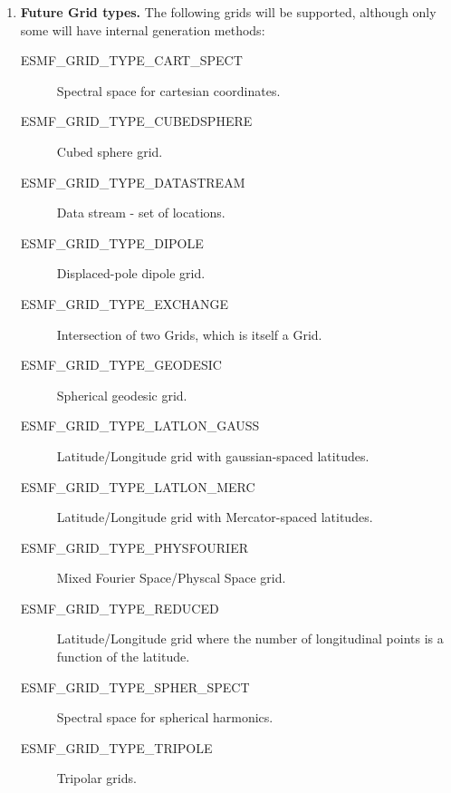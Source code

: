 \begin{enumerate}
\item {\bf Future Grid types.}  The following grids will
be supported, although only some will have internal generation 
methods:
 \begin{description}
    \item [ESMF\_GRID\_TYPE\_CART\_SPECT]
          Spectral space for cartesian coordinates.
    \item [ESMF\_GRID\_TYPE\_CUBEDSPHERE]
          Cubed sphere grid.
    \item [ESMF\_GRID\_TYPE\_DATASTREAM]
          Data stream - set of locations.
    \item [ESMF\_GRID\_TYPE\_DIPOLE]
          Displaced-pole dipole grid.
    \item [ESMF\_GRID\_TYPE\_EXCHANGE]
          Intersection of two Grids, which is itself a Grid.
    \item [ESMF\_GRID\_TYPE\_GEODESIC]
          Spherical geodesic grid.
    \item [ESMF\_GRID\_TYPE\_LATLON\_GAUSS]
          Latitude/Longitude grid with gaussian-spaced latitudes.
    \item [ESMF\_GRID\_TYPE\_LATLON\_MERC]
          Latitude/Longitude grid with Mercator-spaced latitudes.
    \item [ESMF\_GRID\_TYPE\_PHYSFOURIER]
          Mixed Fourier Space/Physcal Space grid.
    \item [ESMF\_GRID\_TYPE\_REDUCED]
          Latitude/Longitude grid where the number of longitudinal points is a
          function of the latitude.
    \item [ESMF\_GRID\_TYPE\_SPHER\_SPECT]
          Spectral space for spherical harmonics.
    \item [ESMF\_GRID\_TYPE\_TRIPOLE]
          Tripolar grids.
 \end{description}


\end{enumerate}

